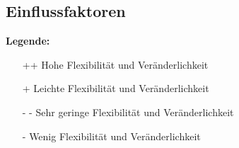 \documentclass[fontsize=12pt,paper=a4,twoside]{scrartcl}
\begin{document}
\subsection{Einflussfaktoren} \label{sec:einflussfaktoren}
\textbf{Legende:}
\begin{itemize}
    \item[++] Hohe Flexibilität und Veränderlichkeit
    \item[ + ] Leichte Flexibilität und Veränderlichkeit
    \item[- - ] Sehr geringe Flexibilität und Veränderlichkeit
    \item[-   ] Wenig Flexibilität und Veränderlichkeit
  \end{itemize}
  \vspace*{20mm}
  




\end{document}
